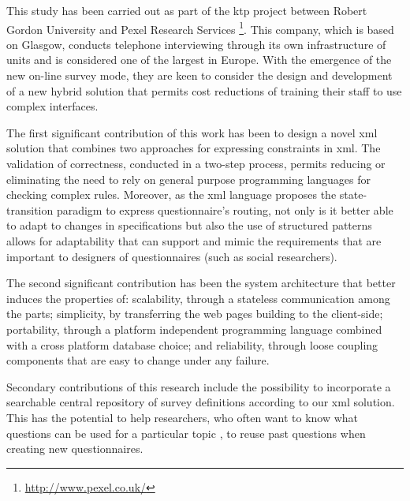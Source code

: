 	This study has been carried out as part of the \gls{ktp} project between Robert Gordon University and Pexel Research Services \footnote{\url{http://www.pexel.co.uk/}}. This company, which is based on Glasgow, conducts telephone interviewing through its own infrastructure of units and is considered one of the largest in Europe. With the emergence of the new on-line survey mode, they are keen to consider the design and development of a new hybrid solution that permits cost reductions of training their staff to use complex interfaces.

	The first significant contribution of this work has been to design a novel \gls{xml} solution that combines two approaches for expressing constraints in \gls{xml}. The validation of correctness, conducted in a two-step process, permits reducing or eliminating the need to rely on general purpose programming languages for checking complex rules. Moreover, as the \gls{xml} language proposes the state-transition paradigm to express questionnaire's routing, not only is it better able to adapt to changes in specifications but also the use of structured patterns allows for adaptability that can support and mimic the requirements that are important to designers of questionnaires (such as social researchers).

	The second significant contribution has been the system architecture that better induces the properties of: scalability, through a stateless communication among the parts; simplicity, by transferring the web pages building to the client-side; portability, through a platform independent programming language combined with a cross platform database choice; and reliability, through loose coupling components that are easy to change under any failure.

	Secondary contributions of this research include the possibility to incorporate a searchable central repository of survey definitions according to our \gls{xml} solution. This has the potential to help researchers, who often want to know what questions can be used for a particular topic \cite{proc:corbett11}, to reuse past questions when creating new questionnaires.